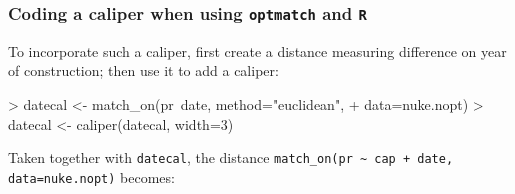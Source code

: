








\begin{frame}[fragile]
\frametitle{Coding a caliper when using \texttt{optmatch} and \texttt{R}}

To incorporate such a caliper, first create a distance measuring difference on year of construction\mbox{;} then use it to add a caliper:

\begin{Schunk}
\begin{Sinput}
> datecal <- match_on(pr~date, method="euclidean", 
+                     data=nuke.nopt)
> datecal <- caliper(datecal, width=3)
\end{Sinput}
\end{Schunk}
\enlargethispage*{550pt}
Taken together with \texttt{datecal}, the distance \texttt{match\_on(pr \textasciitilde
  cap + date, data=nuke.nopt)} becomes:


\end{frame}
